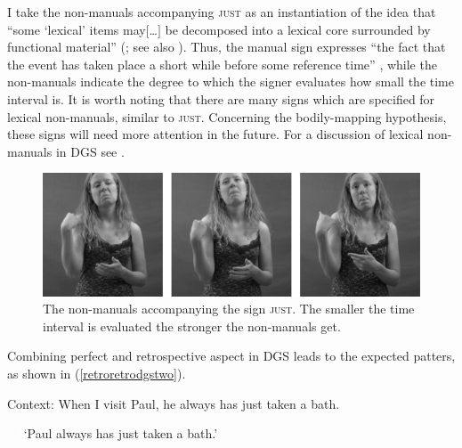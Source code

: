 I take the non-manuals accompanying \textsc{just} as an instantiation of the idea that ``some `lexical' items may$[$\dots$]$ be decomposed into a lexical core surrounded by functional material'' (\citealt[424]{shlonsky2010cartographic}; see also \citealt{kayne2005some, kayne2007several}). Thus, the manual sign expresses ``the fact that the event has taken place a short while before some reference time'' \citep[96]{cinque1999adverbs}, while the non-manuals indicate the degree to which the signer evaluates how small the time interval is. It is worth noting that there are many signs which are specified for lexical non-manuals, similar to \textsc{just}. Concerning the bodily-mapping hypothesis, these signs will need more attention in the future. For a discussion of lexical non-manuals in DGS see \citet{pendzich2017lexicalnmms}.

\begin{figure}[bt]
\centering
	\includegraphics[width=1.0\textwidth]{just2sw.jpg}
	\caption{The non-manuals accompanying the sign \textsc{just}. The smaller the time interval is evaluated the stronger the non-manuals get.}
	\label{fig:just}
\end{figure}

Combining perfect and retrospective aspect in DGS leads to the expected patters, as shown in (\ref{retroretrodgstwo}).

\begin{exe}
\ex Context: When I visit Paul, he always has just taken a bath.\label{retroretrodgstwo}\begin{xlist} 
\ex \textcolor{white}{*}  
\ex *  
\glt \textcolor{white}{*}`Paul always has just taken a bath.' \label{ex:retroretrodgstwob}
\end{xlist}
\end{exe} 

